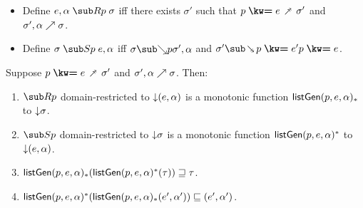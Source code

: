 \begin{lemma}
  \label{lem:aux:list-gen:gc}
  \item
  \begin{itemize}
    \item Define $e, \alpha \listGenFwd{p} \sigma $ iff there exists $\sigma'$ such that $\clauseUncurried{p}{e} \desugarClauseFwd \sigma'$ and ${\sigma'},{\alpha} \nearrow {\sigma}$.
    \item Define $\sigma \listGenBwd{p} e, \alpha$ iff $\totalisebwd{\sigma}{p}{\sigma'}{\alpha}$ and $\sigma'  \desugarClauseBwd{\clauseUncurried{p}{e'}} \clauseUncurried{p}{e}$.
  \end{itemize}
  Suppose $\clauseUncurried{p}{e} \desugarClauseFwd \sigma'$ and ${\sigma'},{\alpha} \nearrow {\sigma}$. Then:
  \begin{enumerate}
     \item $\listGenFwd{p}$ domain-restricted to ${\downarrow}{(e, \alpha)}$ is a monotonic function $\mathsf{listGen}(p, e, \alpha)_*$ to ${\downarrow}{\sigma}$.
     \item $\listGenBwd{p}$ domain-restricted to ${\downarrow}{\sigma}$ is a monotonic function $\mathsf{listGen}(p, e, \alpha)^*$ to ${\downarrow}{(e, \alpha)}$.
     \item $\mathsf{listGen}(p, e, \alpha)_*(\mathsf{listGen}(p, e, \alpha)^*(\tau)) \sqsupseteq \tau$.
     \item $\mathsf{listGen}(p, e, \alpha)^*(\mathsf{listGen}(p, e, \alpha)_*(e', \alpha')) \sqsubseteq (e', \alpha')$.
  \end{enumerate}
\end{lemma}
